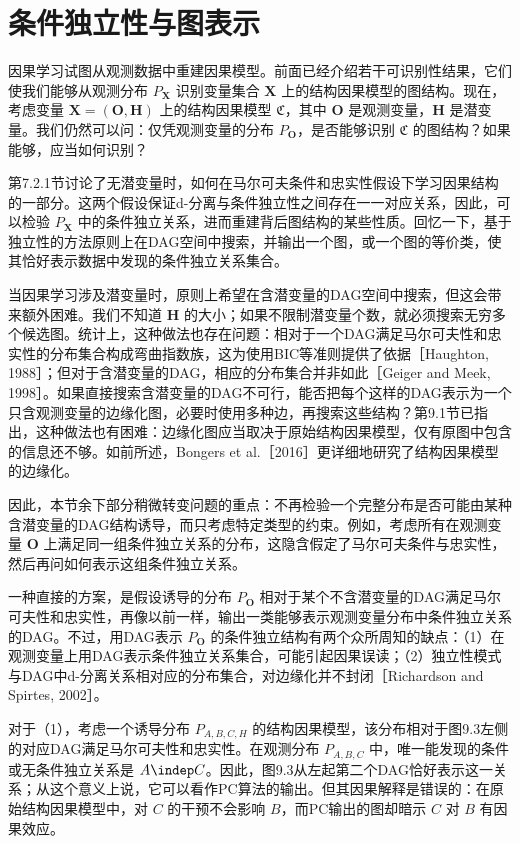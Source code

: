 \section{条件独立性与图表示}

因果学习试图从观测数据中重建因果模型。前面已经介绍若干可识别性结果，它们使我们能够从观测分布 $P_{\mathbf X}$ 识别变量集合 $\mathbf X$ 上的结构因果模型的图结构。现在，考虑变量 $\mathbf X=(\mathbf O,\mathbf H)$ 上的结构因果模型 $\mathfrak C$，其中 $\mathbf O$ 是观测变量，$\mathbf H$ 是潜变量。我们仍然可以问：仅凭观测变量的分布 $P_{\mathbf O}$，是否能够识别 $\mathfrak C$ 的图结构？如果能够，应当如何识别？

第7.2.1节讨论了无潜变量时，如何在马尔可夫条件和忠实性假设下学习因果结构的一部分。这两个假设保证d-分离与条件独立性之间存在一一对应关系，因此，可以检验 $P_{\mathbf X}$ 中的条件独立关系，进而重建背后图结构的某些性质。回忆一下，基于独立性的方法原则上在DAG空间中搜索，并输出一个图，或一个图的等价类，使其恰好表示数据中发现的条件独立关系集合。

当因果学习涉及潜变量时，原则上希望在含潜变量的DAG空间中搜索，但这会带来额外困难。我们不知道 $\mathbf H$ 的大小；如果不限制潜变量个数，就必须搜索无穷多个候选图。统计上，这种做法也存在问题：相对于一个DAG满足马尔可夫性和忠实性的分布集合构成弯曲指数族，这为使用BIC等准则提供了依据［Haughton, 1988］；但对于含潜变量的DAG，相应的分布集合并非如此［Geiger and Meek, 1998］。如果直接搜索含潜变量的DAG不可行，能否把每个这样的DAG表示为一个只含观测变量的边缘化图，必要时使用多种边，再搜索这些结构？第9.1节已指出，这种做法也有困难：边缘化图应当取决于原始结构因果模型，仅有原图中包含的信息还不够。如前所述，Bongers et al.［2016］更详细地研究了结构因果模型的边缘化。

因此，本节余下部分稍微转变问题的重点：不再检验一个完整分布是否可能由某种含潜变量的DAG结构诱导，而只考虑特定类型的约束。例如，考虑所有在观测变量 $\mathbf O$ 上满足同一组条件独立关系的分布，这隐含假定了马尔可夫条件与忠实性，然后再问如何表示这组条件独立关系。

一种直接的方案，是假设诱导的分布 $P_{\mathbf O}$ 相对于某个不含潜变量的DAG满足马尔可夫性和忠实性，再像以前一样，输出一类能够表示观测变量分布中条件独立关系的DAG。不过，用DAG表示 $P_{\mathbf O}$ 的条件独立结构有两个众所周知的缺点：（1）在观测变量上用DAG表示条件独立关系集合，可能引起因果误读；（2）独立性模式与DAG中d-分离关系相对应的分布集合，对边缘化并不封闭［Richardson and Spirtes, 2002］。

对于（1），考虑一个诱导分布 $P_{A,B,C,H}$ 的结构因果模型，该分布相对于图9.3左侧的对应DAG满足马尔可夫性和忠实性。在观测分布 $P_{A,B,C}$ 中，唯一能发现的条件或无条件独立关系是 $A\indep C$。因此，图9.3从左起第二个DAG恰好表示这一关系；从这个意义上说，它可以看作PC算法的输出。但其因果解释是错误的：在原始结构因果模型中，对 $C$ 的干预不会影响 $B$，而PC输出的图却暗示 $C$ 对 $B$ 有因果效应。

